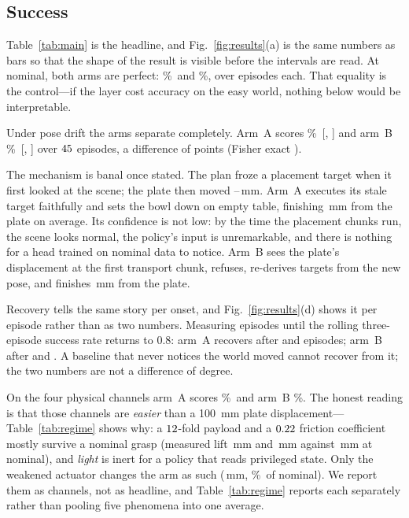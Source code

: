 \documentclass[conference]{IEEEtran}
\theoremstyle{definition}
\begin{document}
\subsection{Success}

Table~\ref{tab:main} is the headline, and Fig.~\ref{fig:results}(a) is the same
numbers as bars so that the shape of the result is visible before the intervals
are read. At nominal, both arms are perfect:
\SafeNominal\%\ and \CELNominal\%, over \SafeNominalN{} episodes each. That
equality is the control---if the layer cost accuracy on the easy world, nothing
below would be interpretable.

Under pose drift the arms separate completely. Arm~A scores
\SafePoseDrift\%\ [\SafePoseDriftLo, \SafePoseDriftHi] and arm~B
\CELPoseDrift\%\ [\CELPoseDriftLo, \CELPoseDriftHi] over $45$
episodes, a difference of \PoseGap{} points (Fisher exact \PoseP).

The mechanism is banal once stated. The plan froze a placement target when it
first looked at the scene; the plate then moved \PoseDeltaMin--\PoseDeltaMax\,mm. Arm~A executes
its stale target faithfully and sets the bowl down on empty table, finishing
\SafePosePlateDist\,mm from the plate on average. Its confidence is not low:
by the time the placement chunks run, the scene looks normal, the policy's
input is unremarkable, and there is nothing for a head trained on nominal data
to notice. Arm~B sees the plate's displacement at the first transport chunk,
refuses, re-derives targets from the new pose, and finishes
\CELPosePlateDist\,mm from the plate.

Recovery tells the same story per onset, and Fig.~\ref{fig:results}(d) shows it
per episode rather than as two numbers. Measuring episodes until the rolling
three-episode success rate returns to $0.8$: arm~A recovers after
\SafeRecoveryFirst{} and \SafeRecoverySecond{} episodes; arm~B after
\CELRecoveryFirst{} and \CELRecoverySecond. A baseline that never notices the
world moved cannot recover from it; the two numbers are not a difference of
degree.

On the four physical channels arm~A scores \SafeChannel\%\ and arm~B
\CELChannel\%. The honest reading is that those channels are \emph{easier} than
a \SI{100}{mm} plate displacement---Table~\ref{tab:regime} shows why: a
$12$-fold payload and a $0.22$ friction coefficient mostly survive a nominal
grasp (measured lift \LiftPayload\,mm and \LiftSlip\,mm against
\LiftNominal\,mm at nominal), and \emph{light} is inert for a policy that reads
privileged state. Only the weakened actuator changes the arm as such
(\LiftActuator\,mm, \LiftActuatorPct\%\ of nominal). We report them as channels,
not as headline, and Table~\ref{tab:regime} reports each separately rather than
pooling five phenomena into one average.
\end{document}
